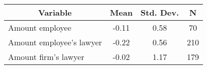 

\begin{tabular}{l c c  c}\hline\hline
\multicolumn{1}{c}{\textbf{Variable}} & \textbf{Mean}
 & \textbf{Std. Dev.} & \textbf{N}\\ \hline
Amount employee & -0.11 & 0.58  & 70\\
Amount employee's lawyer & -0.22 & 0.56  & 210\\
Amount firm's lawyer & -0.02 & 1.17  & 179\\
\hline\end{tabular}

